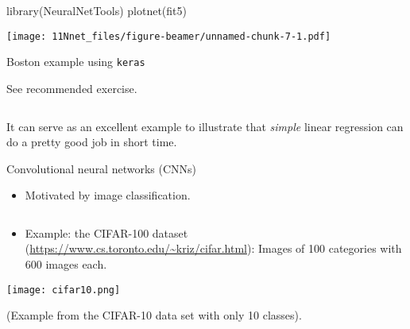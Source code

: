 \documentclass[
  10pt,
  ignorenonframetext,
]{beamer}
\newenvironment{Shaded}{\begin{snugshade}}{\end{snugshade}}
\newcommand{\FunctionTok}[1]{\textcolor[rgb]{0.00,0.00,0.00}{#1}}
\newcommand{\NormalTok}[1]{#1}
\providecommand{\tightlist}{%
  \setlength{\itemsep}{0pt}\setlength{\parskip}{0pt}}
\begin{document}
\begin{frame}[fragile]
\begin{Shaded}
\begin{Highlighting}[]
\FunctionTok{library}\NormalTok{(NeuralNetTools)}
\FunctionTok{plotnet}\NormalTok{(fit5)}
\end{Highlighting}
\end{Shaded}

\texttt{[image: 11Nnet\_files/figure-beamer/unnamed-chunk-7-1.pdf]}
\end{frame}

\begin{frame}[fragile]
\begin{block}{Boston example using \texttt{keras}}
\protect\hypertarget{boston-example-using-keras}{}
\(~\)

See recommended exercise.

\(~\)

It can serve as an excellent example to illustrate that \emph{simple}
linear regression can do a pretty good job in short time.
\end{block}
\end{frame}

\begin{frame}{Convolutional neural networks (CNNs)}
\protect\hypertarget{convolutional-neural-networks-cnns}{}
\(~\)

\begin{itemize}
\tightlist
\item
  Motivated by image classification.
\end{itemize}

\(~\)

\begin{itemize}
\tightlist
\item
  Example: the CIFAR-100 dataset
  (\url{https://www.cs.toronto.edu/~kriz/cifar.html}): Images of 100
  categories with 600 images each.
\end{itemize}

\centering

\texttt{[image: cifar10.png]}

\flushleft
\scriptsize

(Example from the CIFAR-10 data set with only 10 classes).
\end{frame}
\end{document}

